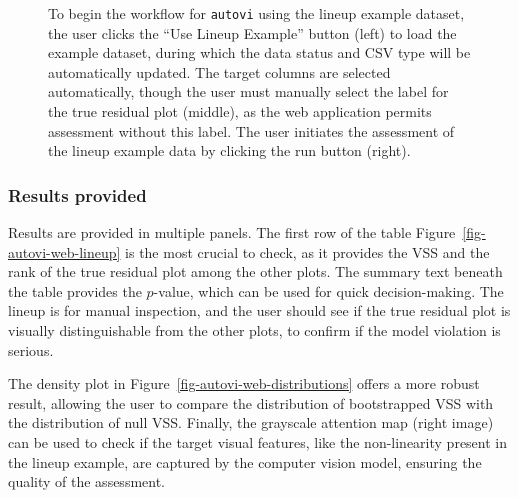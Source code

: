 \documentclass[
doublespace,
  times]{anzsauth}
\begin{document}
\begin{figure}


\caption{\label{fig-autovi-web-setup}To begin the workflow for
\texttt{autovi} using the lineup example dataset, the user clicks the
``Use Lineup Example'' button (left) to load the example dataset, during
which the data status and CSV type will be automatically updated. The
target columns are selected automatically, though the user must manually
select the label for the true residual plot (middle), as the web
application permits assessment without this label. The user initiates
the assessment of the lineup example data by clicking the run button
(right).}

\end{figure}%

\subsubsection{Results provided}\label{results-provided}

Results are provided in multiple panels. The first row of the table
Figure~\ref{fig-autovi-web-lineup} is the most crucial to check, as it
provides the VSS and the rank of the true residual plot among the other
plots. The summary text beneath the table provides the \(p\)-value,
which can be used for quick decision-making. The lineup is for manual
inspection, and the user should see if the true residual plot is
visually distinguishable from the other plots, to confirm if the model
violation is serious.

The density plot in Figure~\ref{fig-autovi-web-distributions} offers a
more robust result, allowing the user to compare the distribution of
bootstrapped VSS with the distribution of null VSS. Finally, the
grayscale attention map (right image) can be used to check if the target
visual features, like the non-linearity present in the lineup example,
are captured by the computer vision model, ensuring the quality of the
assessment.
\end{document}
